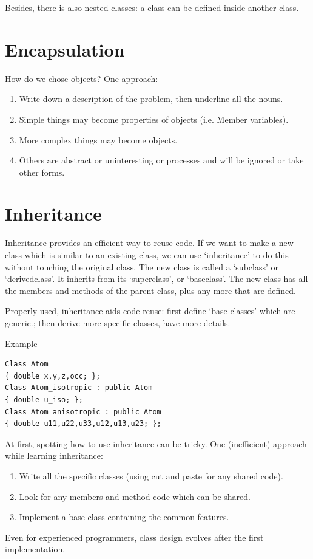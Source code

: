 \documentclass[11pt]{book} %
\begin{document}
Besides, there is also nested classes: a class can be defined inside another class.

\section{Encapsulation}

How do we chose objects? One approach:
\begin{enumerate}
\item Write down a description of the problem, then underline all the nouns.
\item Simple things may become properties of objects (i.e. Member variables).
\item More complex things may become objects.
\item Others are abstract or uninteresting or processes and will be ignored or take other forms.
\end{enumerate}

\section{Inheritance}

Inheritance provides an efficient way to re­use code. If we want to make a new class which is similar to an
existing class, we can use ‘inheritance’ to do this without touching the original class.
The new class is called a ‘sub­class’ or ‘derived­class’. It inherits from its ‘super­class’, or ‘base­class’.
The new class has all the members and methods of the parent class, plus any more that are defined.

Properly used, inheritance aids code re­use: first define ‘base classes’ which are generic.; then derive more specific classes, have more details. 

\underline{Example}
\begin{verbatim}
Class Atom
{ double x,y,z,occ; };
Class Atom_isotropic : public Atom
{ double u_iso; };
Class Atom_anisotropic : public Atom
{ double u11,u22,u33,u12,u13,u23; };
\end{verbatim}

At first, spotting how to use inheritance can be tricky. One (inefficient) approach while learning inheritance:
\begin{enumerate}
\item Write all the specific classes (using cut and paste for any shared code).
\item Look for any members and method code which can be shared.
\item Implement a base class containing the common features.
\end{enumerate}
Even for experienced programmers, class design evolves
after the first implementation.
\end{document}
